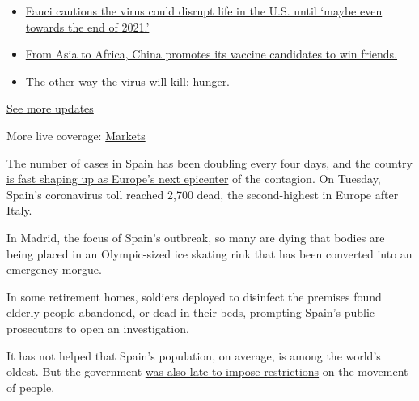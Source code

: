 \begin{itemize}
\tightlist
\item
  \href{https://www.nytimes3xbfgragh.onion/2020/09/11/world/covid-19-coronavirus.html?action=click\&pgtype=Article\&state=default\&region=MAIN_CONTENT_1\&context=storylines_live_updates\#link-dfb8a16}{Fauci
  cautions the virus could disrupt life in the U.S. until `maybe even
  towards the end of 2021.'}
\item
  \href{https://www.nytimes3xbfgragh.onion/2020/09/11/world/covid-19-coronavirus.html?action=click\&pgtype=Article\&state=default\&region=MAIN_CONTENT_1\&context=storylines_live_updates\#link-7104d154}{From
  Asia to Africa, China promotes its vaccine candidates to win friends.}
\item
  \href{https://www.nytimes3xbfgragh.onion/2020/09/11/world/covid-19-coronavirus.html?action=click\&pgtype=Article\&state=default\&region=MAIN_CONTENT_1\&context=storylines_live_updates\#link-393ad215}{The
  other way the virus will kill: hunger.}
\end{itemize}

\href{https://www.nytimes3xbfgragh.onion/2020/09/11/world/covid-19-coronavirus.html?action=click\&pgtype=Article\&state=default\&region=MAIN_CONTENT_1\&context=storylines_live_updates}{See
more updates}

More live coverage:
\href{https://www.nytimes3xbfgragh.onion/live/2020/09/11/business/stock-market-today-coronavirus?action=click\&pgtype=Article\&state=default\&region=MAIN_CONTENT_1\&context=storylines_live_updates}{Markets}

The number of cases in Spain has been doubling every four days, and the
country
\href{https://www.nytimes3xbfgragh.onion/2020/03/20/world/europe/coronavirus-spain.html?searchResultPosition=3}{is
fast shaping up as Europe's next epicenter} of the contagion. On
Tuesday, Spain's coronavirus toll reached 2,700 dead, the second-highest
in Europe after Italy.

In Madrid, the focus of Spain's outbreak, so many are dying that bodies
are being placed in an Olympic-sized ice skating rink that has been
converted into an emergency morgue.

In some retirement homes, soldiers deployed to disinfect the premises
found elderly people abandoned, or dead in their beds, prompting Spain's
public prosecutors to open an investigation.

It has not helped that Spain's population, on average, is among the
world's oldest. But the government
\href{https://www.nytimes3xbfgragh.onion/2020/03/15/world/europe/spain-coronavirus.html?searchResultPosition=4}{was
also late to impose restrictions} on the movement of people.

